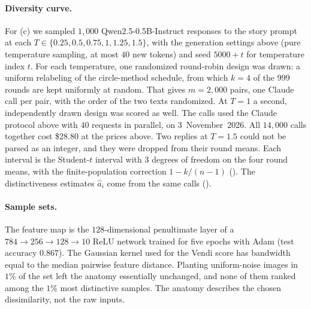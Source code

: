 \paragraph{Diversity curve.} For (c) we sampled $1{,}000$
Qwen2.5-0.5B-Instruct responses to the story prompt at each
$T\in\{0.25,0.5,0.75,1,1.25,1.5\}$, with the generation settings above
(pure temperature sampling, at most $40$ new tokens) and seed $5000+t$ for
temperature index $t$. For each temperature, one randomized round-robin
design was drawn: a uniform relabeling of the circle-method schedule, from
which $k=4$ of the $999$ rounds are kept uniformly at random. That gives
$m=2{,}000$ pairs, one Claude call per pair, with the order of the two texts
randomized. At $T=1$ a second, independently drawn design was scored as
well. The calls used the Claude protocol above with $40$ requests in
parallel, on 3~November~2026. All $14{,}000$ calls together cost \$28.80 at
the prices above. Two replies at $T=1.5$ could not be parsed as an integer,
and they were dropped from their round means. Each interval is the Student-$t$
interval with $3$ degrees of freedom on the four round means, with the
finite-population correction $1-k/(n-1)$ (). The
distinctiveness estimates $\widehat a_i$ come from the same calls
().

\paragraph{Sample sets.} The feature map is the $128$-dimensional
penultimate layer of a $784\to256\to128\to10$ ReLU network trained for
five epochs with Adam (test accuracy $0.867$). The Gaussian kernel used for the Vendi
score has bandwidth equal to the median pairwise feature distance. Planting uniform-noise
images in $1\%$ of the set left the anatomy essentially unchanged, and none of them
ranked among the $1\%$ most distinctive samples. The anatomy describes the
chosen dissimilarity, not the raw inputs.
